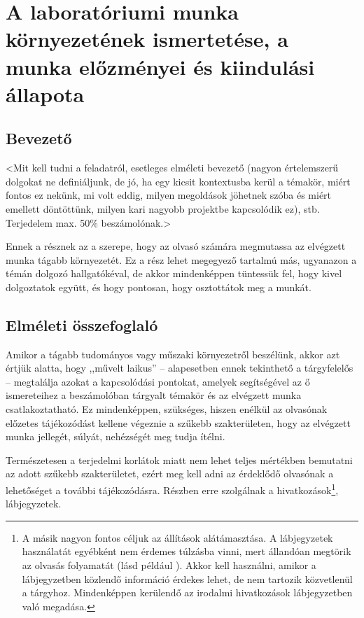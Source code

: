 \documentclass[a4paper,oneside]{article}
\begin{document}
\section{A laboratóriumi munka környezetének ismertetése,
     a munka előzményei és kiindulási állapota}
\label{sec:kornyezet}
\subsection{Bevezető}
\label{sec:bevezeto}

<Mit kell tudni a feladatról, esetleges elméleti bevezető (nagyon
értelemszerű dolgokat ne definiáljunk, de jó, ha egy kicsit
kontextusba kerül a témakör, miért fontos ez nekünk, mi volt eddig,
milyen megoldások jöhetnek szóba és miért emellett döntöttünk, milyen
kari nagyobb projektbe kapcsolódik ez), stb. Terjedelem max. 50\%
beszámolónak.>

Ennek a résznek az a szerepe, hogy az olvasó számára megmutassa az
elvégzett munka tágabb környezetét. Ez a rész lehet megegyező tartalmú
más, ugyanazon a témán dolgozó hallgatókéval, de akkor mindenképpen
tüntessük fel, hogy kivel dolgoztatok együtt, és hogy pontosan, hogy
osztottátok meg a munkát.

\subsection{Elméleti összefoglaló}

Amikor a tágabb tudományos vagy műszaki környezetről beszélünk, akkor
azt értjük alatta, hogy ,,művelt laikus'' -- alapesetben ennek
tekinthető a tárgyfelelős -- megtalálja azokat a kapcsolódási
pontokat, amelyek segítségével az ő ismereteihez a beszámolóban
tárgyalt témakör és az elvégzett munka csatlakoztatható.  Ez
mindenképpen, szükséges, hiszen enélkül az olvasónak előzetes
tájékozódást kellene végeznie a szűkebb szakterületen, hogy az
elvégzett munka jellegét, súlyát, nehézségét meg tudja ítélni.

Természetesen a terjedelmi korlátok miatt nem lehet teljes mértékben
bemutatni az adott szűkebb szakterületet, ezért meg kell adni az
érdeklődő olvasónak a lehetőséget a további tájékozódásra.  Részben
erre szolgálnak a hivatkozások\footnote{A másik nagyon fontos céljuk
  az állítások alátámasztása.  A lábjegyzetek használatát egyébként
  nem érdemes túlzásba vinni, mert állandóan megtörik az olvasás
  folyamatát (lásd például \cite{esterhazy}).  Akkor kell használni,
  amikor a lábjegyzetben közlendő információ érdekes lehet, de nem
  tartozik közvetlenül a tárgyhoz.  Mindenképpen kerülendő az irodalmi
  hivatkozások lábjegyzetben való megadása.}, lábjegyzetek.
\end{document}
